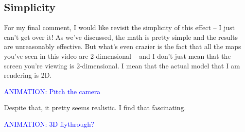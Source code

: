 \documentclass{article}
\newcommand\animation[1]{\textcolor{blue}{ANIMATION: #1}}
\begin{document}
\subsection{Simplicity}

For my final comment, I would like revisit the simplicity of this effect -- I just can't get over it!
As we've discussed, the math is pretty simple and the results are unreasonably effective.
But what's even crazier is the fact that all the maps you've seen in this video are 2-dimensional -- and I don't just mean that the screen you're viewing is 2-dimensional.
I mean that the actual model that I am rendering is 2D.

\animation{Pitch the camera}

Despite that, it pretty seems realistic.
I find that fascinating.

\animation{3D flythrough?}
\end{document}
